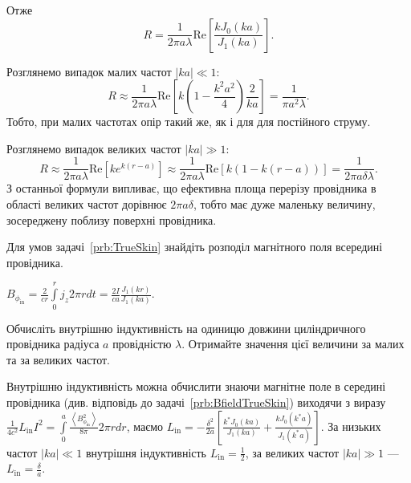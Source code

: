 \begin{problem}
\begin{solution}
Отже
\[
    R = \frac{1}{2\pi a\lambda}  \mathrm{Re}\left[  \frac{kJ_0(ka)}{J_1(ka)} \right].
\]

Розглянемо випадок малих частот $|ka| \ll 1$:
\[
    R \approx \frac{1}{2\pi a\lambda}  \mathrm{Re} \left[k\left( 1 - \frac{k^2a^2}{4}\right)\frac{2}{ka}  \right] = \frac{1}{\pi a^2 \lambda}.
\]
Тобто, при малих частотах опір такий же, як і для для постійного струму.

Розглянемо випадок великих частот $|ka| \gg 1$:
\[
    R \approx \frac{1}{2\pi a\lambda} \mathrm{Re}\left[  ke^{k(r-a)} \right] \approx \frac{1}{2\pi a\lambda} \mathrm{Re}\left[  k(1-k(r-a)) \right] =  \frac{1}{2\pi a\delta\lambda}.
\]
З останньої формули випливає, що ефективна площа перерізу провідника в області великих частот дорівнює $2\pi a\delta$, тобто має дуже маленьку величину, зосереджену поблизу поверхні провідника.
\end{solution}
\end{problem}

\begin{problem}\label{prb:BfieldTrueSkin}
    Для умов задачі~\ref{prb:TrueSkin} знайдіть розподіл магнітного поля всередині провідника.
\begin{solution}
    $B_{\phi_{\mathrm{in}}} = \frac{2}{cr} \int\limits_0^r j_z 2\pi r dt = \frac{2I}{ca} \frac{J_1(kr)}{J_1(ka)}$.
\end{solution}
\end{problem}


\begin{problem}
        Обчисліть внутрішню індуктивність на одиницю довжини циліндричного провідника радіуса $a$ провідністю $\lambda$. Отримайте значення цієї величини за малих та за великих частот.
\begin{solution}
    Внутрішню індуктивність можна обчислити знаючи магнітне поле в середині провідника (див. відповідь до задачі~\ref{prb:BfieldTrueSkin})  виходячи з виразу $\frac{1}{4c^2}L_\mathrm{in}I^2 = \int\limits_0^a \frac{\left\langle  B_{\phi_{\mathrm{in}}}^2\right\rangle }{8\pi} 2\pi rdr$, маємо
    $L_\mathrm{in}  = -\frac{\delta^2}{2a}\left[ \frac{k^*J_0(ka)}{J_1(ka)} + \frac{kJ_0(k^*a)}{J_1(k^*a)}\right] $. За низьких частот $|ka| \ll 1$ внутрішня індуктивність  $L_\mathrm{in} = \frac12$, за великих частот $|ka| \gg 1$ --- $L_\mathrm{in} = \frac\delta a$.
\end{solution}
\end{problem}

